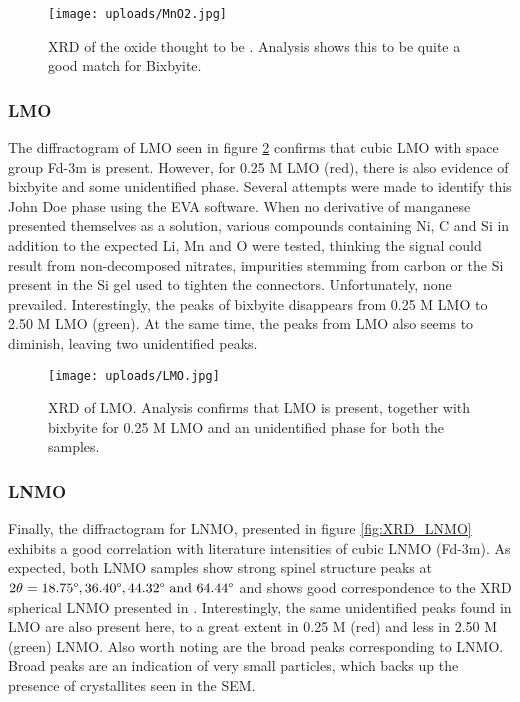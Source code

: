 \documentclass[Main/main.tex]{subfiles}
\begin{document}
\begin{figure}[ht]
    \centering
    \texttt{[image: uploads/MnO2.jpg]}
    \caption{XRD of the oxide thought to be . Analysis shows this to be quite a good match for  Bixbyite. }
    \label{fig:XRD_MnO2}
\end{figure}




\FloatBarrier
\subsubsection{LMO}
The diffractogram of LMO seen in figure \ref{fig:XRD_LMO} confirms that cubic LMO with space group Fd-3m is present. However, for 0.25 M LMO (red), there is also evidence of  bixbyite and some unidentified phase. Several attempts were made to identify this John Doe phase using the EVA software. When no derivative of manganese presented themselves as a solution, various compounds containing Ni, C and Si in addition to the expected Li, Mn and O were tested, thinking the signal could result from non-decomposed nitrates, impurities stemming from carbon or the Si present in the Si gel used to tighten the connectors. Unfortunately, none prevailed.
Interestingly, the peaks of bixbyite disappears from 0.25 M LMO to 2.50 M LMO (green). At the same time, the peaks from LMO also seems to diminish, leaving two unidentified peaks. 


\begin{figure}[ht]
    \centering
    \texttt{[image: uploads/LMO.jpg]}
    \caption{XRD of LMO. Analysis confirms that LMO is present, together with bixbyite for 0.25 M LMO and an unidentified phase for both the samples.}
    \label{fig:XRD_LMO}
\end{figure}

\FloatBarrier
\subsubsection{LNMO}
Finally, the diffractogram for LNMO, presented in figure \ref{fig:XRD_LNMO} exhibits a good correlation with literature intensities of cubic LNMO (Fd-3m). As expected, both LNMO samples show strong spinel structure peaks at $2\theta = 18.75\degree, 36.40\degree, 44.32\degree \text{ and } 64.44\degree$ and shows good correspondence to the XRD spherical LNMO presented in \cite{LNMO}. Interestingly, the same unidentified peaks found in LMO are also present here, to a great extent in 0.25 M (red) and less in 2.50 M (green) LNMO. Also worth noting are the broad peaks corresponding to LNMO. Broad peaks are an indication of very small particles, which backs up the presence of crystallites seen in the SEM. 
\end{document}
